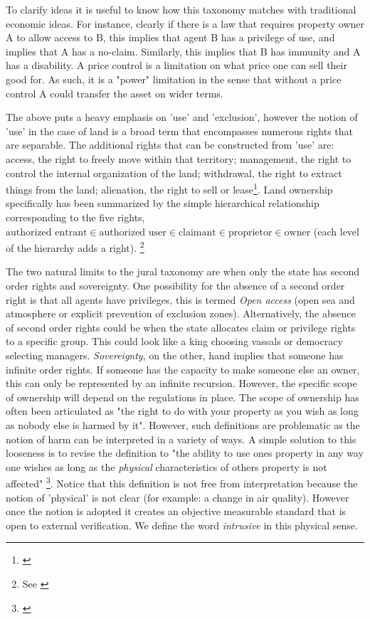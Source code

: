 To clarify ideas it is useful to know how this taxonomy matches with traditional economic ideas. For instance, clearly if there is a law that requires property owner A to allow access to B, this implies that agent B has a privilege of use, and implies that A has a no-claim. Similarly, this implies that B has immunity and A has a disability. A price control is a limitation on what price one can sell their good for. As such, it is a "power" limitation in the sense that without a price control A could transfer the asset on wider terms.

The above puts a heavy emphasis on 'use' and 'exclusion', however the notion of 'use' in the case of land is a broad term that encompasses numerous rights that are separable. The additional rights that can be constructed from 'use' are: access, the right to freely move within that territory; management, the right to control the internal organization of the land; withdrawal, the right to extract things from the land; alienation, the right to sell or lease\footnote{\cite{ostrom2010private}}.
Land ownership specifically has been summarized by the simple hierarchical relationship corresponding to the five rights, $\text{authorized entrant} \in \text{authorized user}  \in \text{claimant}  \in \text{proprietor} \in \text{owner}$ (each level of the hierarchy adds a right). \footnote{See \cite{schlager1992property}}


The two natural limits to the jural taxonomy are when only the state has second order rights and sovereignty. One possibility for the absence of a second order right is that all agents have privileges, this is termed \textit{Open access} (open sea and atmosphere or explicit prevention of exclusion zones). Alternatively, the absence of second order rights could be when the state allocates claim or privilege rights to a specific group. This could look like a king choosing vassals or democracy selecting managers. \textit{Sovereignty}, on the other, hand implies that someone has infinite order rights. If someone has the capacity to make someone else an owner, this can only be represented by an infinite recursion. However, the specific scope of ownership will depend on the regulations in place. The scope of ownership has often been articulated as "the right to do with your property as you wish as long as nobody else is harmed by it". However, such definitions are problematic as the notion of harm can be interpreted in a variety of ways. A simple solution to this looseness is to revise the definition to "the ability to use ones property in any way one wishes as long as the \textit{physical} characteristics of others property is not affected" \footnote{\cite{Alchian1965}}. Notice that this definition is not free from interpretation because the notion of 'physical' is not clear (for example: a change in air quality). However once the notion is adopted it creates an objective measurable standard that is open to external verification. We define the word \textit{intrusive} in this physical sense.


